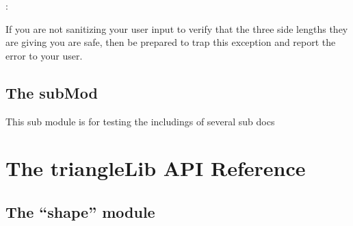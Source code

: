 \documentclass[letterpaper,10pt,english]{sphinxmanual}
\begin{document}
\begin{sphinxVerbatim}[commandchars=\\\{\}]
   
  
: 
\end{sphinxVerbatim}

If you are not sanitizing your user input
to verify that the three side lengths they are giving you are safe,
then be prepared to trap this exception
and report the error to your user.


\section{The subMod}
\label{\detokenize{guide:the-submod}}\label{\detokenize{guide:module-trianglelib.subMod}}
This sub module is for testing the includings of several sub docs


\chapter{The triangleLib API Reference}
\label{\detokenize{api::doc}}\label{\detokenize{api:the-trianglelib-api-reference}}

\section{The “shape” module}
\label{\detokenize{api:module-trianglelib.shape}}\label{\detokenize{api:the-shape-module}}
\end{document}
